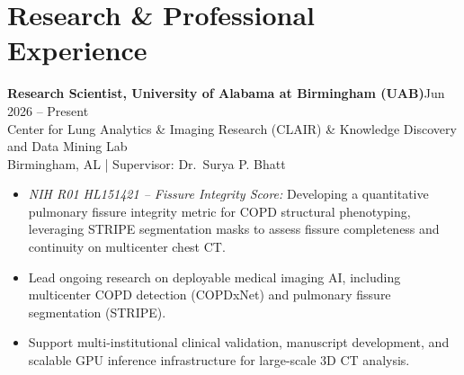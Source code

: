 \documentclass[11pt]{article}
\newcommand{\cventry}[3]{%
  \noindent\textbf{#1}\hfill #2\\
  \noindent #3 \par
}
\begin{document}
\section{Research \& Professional Experience}
\cventry
{Research Scientist, University of Alabama at Birmingham (UAB)}
{Jun 2026 -- Present}
{Center for Lung Analytics \& Imaging Research (CLAIR) \& Knowledge Discovery and Data Mining Lab\\
Birmingham, AL \;\;|\;\; Supervisor: Dr.\ Surya P. Bhatt
\begin{itemize}
  \item \textit{NIH R01 HL151421 -- Fissure Integrity Score:} Developing a quantitative pulmonary fissure integrity metric for COPD structural phenotyping, leveraging STRIPE segmentation masks to assess fissure completeness and continuity on multicenter chest CT.
  \item Lead ongoing research on deployable medical imaging AI, including multicenter COPD detection (COPDxNet) and pulmonary fissure segmentation (STRIPE).
  \item Support multi-institutional clinical validation, manuscript development, and scalable GPU inference infrastructure for large-scale 3D CT analysis.
\end{itemize}
}
\end{document}
